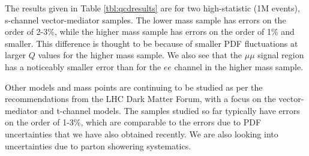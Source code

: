 The results given in Table \ref{tbl:qcdresults} are for two high-statistic (1M events), s-channel vector-mediator samples. The lower mass sample has errors on the order of 2-3\%, while the higher mass sample has errors on the order of 1\% and smaller. This difference is thought to be because of smaller PDF fluctuations at larger $Q$ values for the higher mass sample. We also see that the $\mu\mu$ signal region has a noticeably smaller error than for the $ee$ channel in the higher mass sample.

Other models and mass points are continuing to be studied as per the recommendations from the LHC Dark Matter Forum, with a focus on the vector-mediator and t-channel models. The samples studied so far typically have errors on the order of 1-3\%, which are comparable to the errors due to PDF uncertainties that we have also obtained recently. We are also looking into uncertainties due to parton showering systematics.
